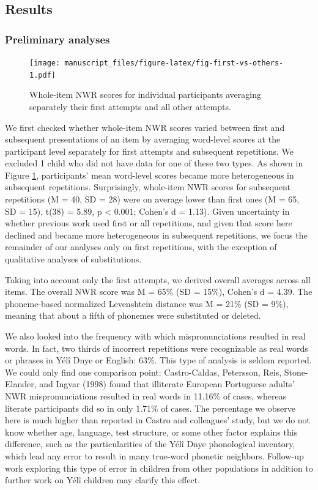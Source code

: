 \documentclass[english,,man,floatsintext]{apa6}
\begin{document}
\hypertarget{results}{%
\subsection{Results}\label{results}}

\hypertarget{preliminary-analyses}{%
\subsubsection{Preliminary analyses}\label{preliminary-analyses}}

\begin{figure}
\centering
\texttt{[image: manuscript\_files/figure-latex/fig-first-vs-others-1.pdf]}
\caption{\label{fig:fig-first-vs-others}Whole-item NWR scores for individual participants averaging separately their first attempts and all other attempts.}
\end{figure}

We first checked whether whole-item NWR scores varied between first and subsequent presentations of an item by averaging word-level scores at the participant level separately for first attempts and subsequent repetitions. We excluded 1 child who did not have data for one of these two types. As shown in Figure \ref{fig:fig-first-vs-others}, participants' mean word-level scores became more heterogeneous in subsequent repetitions. Surprisingly, whole-item NWR scores for subsequent repetitions (M = 40, SD = 28)
were on average lower than first ones (M = 65, SD = 15), t(38) = 5.89, p \textless{} 0.001; Cohen's d = 1.13). Given uncertainty in whether previous work used first or all repetitions, and given that score here declined and became more heterogeneous in subsequent repetitions, we focus the remainder of our analyses only on first repetitions, with the exception of qualitative analyses of substitutions.

Taking into account only the first attempts, we derived overall averages across all items. The overall NWR score was M = 65\% (SD = 15\%), Cohen's d = 4.39. The phoneme-based normalized Levenshtein distance was M = 21\% (SD = 9\%), meaning that about a fifth of phonemes were substituted or deleted.

We also looked into the frequency with which mispronunciations resulted in real words. In fact, two thirds of incorrect repetitions were recognizable as real words or phrases in Yélî Dnye or English: 63\%. This type of analysis is seldom reported. We could only find one comparison point: Castro-Caldas, Petersson, Reis, Stone-Elander, and Ingvar (1998) found that illiterate European Portuguese adults' NWR mispronunciations resulted in real words in 11.16\% of cases, whereas literate participants did so in only 1.71\% of cases. The percentage we observe here is much higher than reported in Castro and colleagues' study, but we do not know whether age, language, test structure, or some other factor explains this difference, such as the particularities of the Yélî Dnye phonological inventory, which lead any error to result in many true-word phonetic neighbors. Follow-up work exploring this type of error in children from other populations in addition to further work on Yélî children may clarify this effect.
\end{document}
